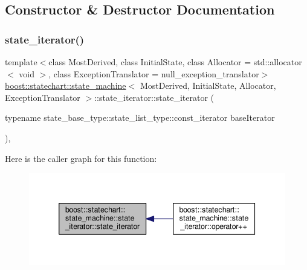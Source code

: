\subsection{Constructor \& Destructor Documentation}
\mbox{\label{classboost_1_1statechart_1_1state__machine_1_1state__iterator_abf22b7dd6bc3662b86f80ead66e15eab}} 
\subsubsection{\texorpdfstring{state\+\_\+iterator()}{state\_iterator()}}
{\footnotesize\ttfamily template$<$class Most\+Derived, class Initial\+State, class Allocator = std\+::allocator$<$ void $>$, class Exception\+Translator = null\+\_\+exception\+\_\+translator$>$ \\
\mbox{\hyperlink{classboost_1_1statechart_1_1state__machine}{boost\+::statechart\+::state\+\_\+machine}}$<$ Most\+Derived, Initial\+State, Allocator, Exception\+Translator $>$\+::state\+\_\+iterator\+::state\+\_\+iterator (\begin{DoxyParamCaption}\item[{typename state\+\_\+base\+\_\+type\+::state\+\_\+list\+\_\+type\+::const\+\_\+iterator}]{base\+Iterator }\end{DoxyParamCaption})\hspace{0.3cm}{\ttfamily [inline]}, {\ttfamily [explicit]}}

Here is the caller graph for this function\+:
\nopagebreak
\begin{figure}[H]
\begin{center}
\leavevmode
\includegraphics[width=339pt]{classboost_1_1statechart_1_1state__machine_1_1state__iterator_abf22b7dd6bc3662b86f80ead66e15eab_icgraph}
\end{center}
\end{figure}


